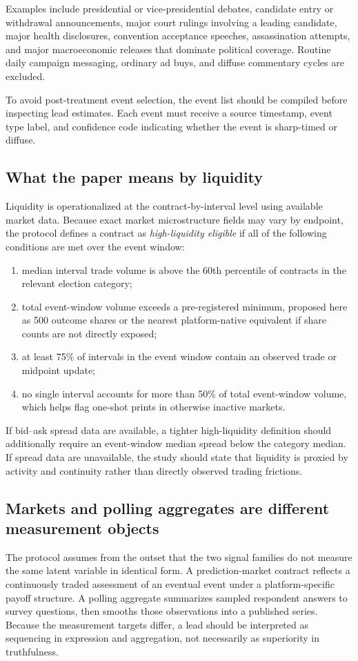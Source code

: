 \documentclass[11pt]{article}
\begin{document}
Examples include presidential or vice-presidential debates, candidate entry or withdrawal announcements, major court rulings involving a leading candidate, major health disclosures, convention acceptance speeches, assassination attempts, and major macroeconomic releases that dominate political coverage. Routine daily campaign messaging, ordinary ad buys, and diffuse commentary cycles are excluded.

To avoid post-treatment event selection, the event list should be compiled before inspecting lead estimates. Each event must receive a source timestamp, event type label, and confidence code indicating whether the event is sharp-timed or diffuse.

\subsection{What the paper means by liquidity}
Liquidity is operationalized at the contract-by-interval level using available market data. Because exact market microstructure fields may vary by endpoint, the protocol defines a contract as \emph{high-liquidity eligible} if all of the following conditions are met over the event window:
\begin{enumerate}
\item median interval trade volume is above the 60th percentile of contracts in the relevant election category;
\item total event-window volume exceeds a pre-registered minimum, proposed here as 500 outcome shares or the nearest platform-native equivalent if share counts are not directly exposed;
\item at least 75\% of intervals in the event window contain an observed trade or midpoint update;
\item no single interval accounts for more than 50\% of total event-window volume, which helps flag one-shot prints in otherwise inactive markets.
\end{enumerate}

If bid--ask spread data are available, a tighter high-liquidity definition should additionally require an event-window median spread below the category median. If spread data are unavailable, the study should state that liquidity is proxied by activity and continuity rather than directly observed trading frictions.

\subsection{Markets and polling aggregates are different measurement objects}
The protocol assumes from the outset that the two signal families do not measure the same latent variable in identical form. A prediction-market contract reflects a continuously traded assessment of an eventual event under a platform-specific payoff structure. A polling aggregate summarizes sampled respondent answers to survey questions, then smooths those observations into a published series. Because the measurement targets differ, a lead should be interpreted as sequencing in expression and aggregation, not necessarily as superiority in truthfulness.
\end{document}

